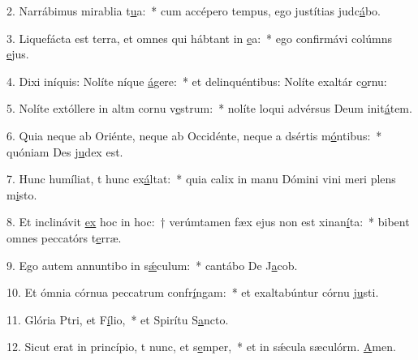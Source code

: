 2. Narrábimus mirablia t\uline{u}a:~* cum accépero tempus, ego justítias judc\uline{á}bo.\par 
3. Liquefácta est terra, et omnes qui hábtant in \uline{e}a:~* ego confirmávi colúmns \uline{e}jus.\par 
4. Dixi iníquis: Nolíte níque \uline{á}gere:~* et delinquéntibus: Nolíte exaltár c\uline{o}rnu:\par 
5. Nolíte extóllere in altm cornu v\uline{e}strum:~* nolíte loqui advérsus Deum init\uline{á}tem.\par 
6. Quia neque ab Oriénte, neque ab Occidénte, neque a dsértis m\uline{ó}ntibus:~* quóniam Des j\uline{u}dex est.\par 
7. Hunc humíliat, t hunc ex\uline{á}ltat:~* quia calix in manu Dómini vini meri plens m\uline{i}sto.\par 
8. Et inclinávit \uline{ex} hoc in hoc:~† verúmtamen fæx ejus non est xinan\uline{í}ta:~* bibent omnes peccatórs t\uline{e}rræ.\par 
9. Ego autem annuntibo in s\uline{ǽ}culum:~* cantábo De J\uline{a}cob.\par 
10. Et ómnia córnua peccatrum confr\uline{í}ngam:~* et exaltabúntur córnu j\uline{u}sti.\par 
11. Glória Ptri, et F\uline{í}lio,~* et Spirítu S\uline{a}ncto.\par 
12. Sicut erat in princípio, t nunc, et s\uline{e}mper,~* et in sǽcula sæculórm. \uline{A}men.\par 
